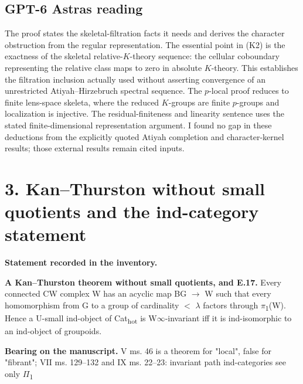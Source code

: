 \subsection*{GPT-6 Astra\textquotesingle s reading}

The proof states the skeletal-filtration facts it needs and derives the character obstruction from the regular representation. The essential point in (K2) is the exactness of the skeletal relative-$K$-theory sequence: the cellular coboundary representing the relative class maps to zero in absolute $K$-theory. This establishes the filtration inclusion actually used without asserting convergence of an unrestricted Atiyah--Hirzebruch spectral sequence. The $p$-local proof reduces to finite lens-space skeleta, where the reduced $K$-groups are finite $p$-groups and localization is injective. The residual-finiteness and linearity sentence uses the stated finite-dimensional representation argument. I found no gap in these deductions from the explicitly quoted Atiyah completion and character-kernel results; those external results remain cited inputs.

\par\bigskip

\section*{3. Kan--Thurston without small quotients and the ind-category statement}


\label{nr:entry3}

\noindent\textbf{Statement recorded in the inventory.}\par\smallskip

\textbf{A Kan--Thurston theorem without small quotients, and E.17.} Every connected CW complex W has an acyclic map BG \ensuremath{\to} W such that every homomorphism from G to a group of cardinality \ensuremath{<} \ensuremath{\lambda} factors through \ensuremath{\pi}\textsubscript{1}(W). Hence a U-small ind-object of Cat\textsubscript{hot} is W\ensuremath{\infty}-invariant iff it is ind-isomorphic to an ind-object of groupoids.


\noindent\textbf{Bearing on the manuscript.} V ms. 46 is a theorem for "local", false for "fibrant"; VII ms. 129--132 and IX ms. 22--23: invariant path ind-categories see only \ensuremath{\Pi}\textsubscript{1}\par\smallskip

